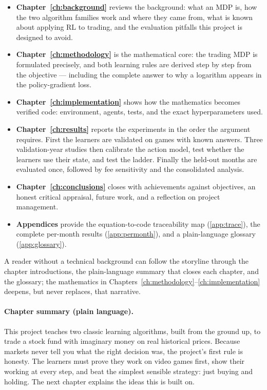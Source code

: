 \begin{itemize}
  \item \textbf{Chapter~\ref{ch:background}} reviews the background: what
        an MDP is, how the two algorithm families work and where they
        came from, what is known about applying RL to trading, and the
        evaluation pitfalls this project is designed to avoid.
  \item \textbf{Chapter~\ref{ch:methodology}} is the mathematical core:
        the trading MDP is formulated precisely, and both learning rules
        are derived step by step from the objective --- including the
        complete answer to why a logarithm appears in the policy-gradient
        loss.
  \item \textbf{Chapter~\ref{ch:implementation}} shows how the
        mathematics becomes verified code: environment, agents, tests,
        and the exact hyperparameters used.
  \item \textbf{Chapter~\ref{ch:results}} reports the experiments in the
        order the argument requires. First the learners are validated on
        games with known answers. Three validation-year studies then
        calibrate the action model, test whether the learners use their
        state, and test the ladder. Finally the held-out months are
        evaluated once, followed by fee sensitivity and the consolidated
        analysis.
  \item \textbf{Chapter~\ref{ch:conclusions}} closes with achievements
        against objectives, an honest critical appraisal, future work,
        and a reflection on project management.
  \item \textbf{Appendices} provide the equation-to-code traceability map
        (\ref{app:trace}), the complete per-month results
        (\ref{app:permonth}), and a plain-language glossary
        (\ref{app:glossary}).
\end{itemize}

A reader without a technical background can follow the storyline through
the chapter introductions, the plain-language summary that closes each
chapter, and the glossary; the mathematics in
Chapters~\ref{ch:methodology}--\ref{ch:implementation} deepens, but never
replaces, that narrative.

\paragraph{Chapter summary (plain language).} This project teaches two
classic learning algorithms, built from the ground up, to trade a stock
fund with imaginary money on real historical prices. Because markets
never tell you what the right decision was, the project's first rule is
honesty. The learners must prove they work on video games first, show
their working at every step, and beat the simplest sensible strategy:
just buying and holding. The next chapter explains the ideas this is
built on.
